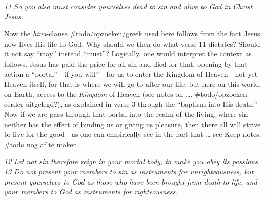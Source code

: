 \emph{11 So you also must consider yourselves dead to sin and alive to
God in Christ Jesus.}

Now the \emph{hina}-clause \#todo/opzoeken/greek used here follows from
the fact Jesus now lives His life to God. Why should we then do what
verse 11 dictates? Should it not say ``may'' instead ``must''?
Logically, one would interpret the context as follows. Jesus has paid
the price for all sin and died for that, opening by that action a
``portal''---if you will''---for us to enter the Kingdom of Heaven---not
yet Heaven itself, for that is where we will go to after our life, but
here on this world, on Earth, access to the \emph{Kingdom} of Heaven
(see notes on \ldots. \#todo/opzoeken eerder uitgelegd?), as explained
in verse 3 through the ``baptism into His death.'' Now if we are pass
through that portal into the realm of the living, where sin neither has
the effect of binding us or giving us pleasure, then there all will
strive to live for the good---as one can empirically see in the fact
that \ldots{} see Keep notes. \#todo nog af te maken

\emph{12 Let not sin therefore reign in your mortal body, to make you
obey its passions. 13 Do not present your members to sin as instruments
for unrighteousness, but present yourselves to God as those who have
been brought from death to life, and your members to God as instruments
for righteousness.}

